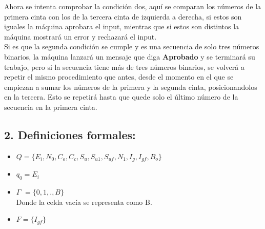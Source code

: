\documentclass[12pt]{article}
\begin{document}
Ahora se intenta comprobar la condición dos, aquí se comparan los números de la primera cinta con los de la tercera cinta de izquierda a derecha, si estos son iguales la máquina aprobara el input, mientras que si estos son distintos la máquina mostrará un error y rechazará el input.\\
Si es que la segunda condición se cumple y es una secuencia de solo tres números binarios, la máquina lanzará un mensaje que diga \textbf{Aprobado} y se terminará su trabajo, pero si la secuencia tiene más de tres números binarios, se volverá a repetir el mismo procedimiento que antes, desde el momento en el que se empiezan a sumar los números de la primera y la segunda cinta, posicionandolos en la tercera. Esto se repetirá hasta que quede solo el último número de la secuencia en la primera cinta. 

\subsection*{2. Definiciones formales:}
\begin{itemize}
		        \item $Q = \{E_{i}, N_{0}, C_{o}, C_{c}, S_{u}, S_{u1}, S_{uf}, N_{1}, I_{g}, I_{gf}, B_{o}\}$
		        
		        \item $q_{0} = E_{i}$
		        
		        \item $\Gamma$  $=\{0,1,.,B\}$\\
		        Donde la celda vacía se representa como B.
		        
		        \item $F = \{I_{gf}\}$
		        

 		    \end{itemize}
\end{document}
